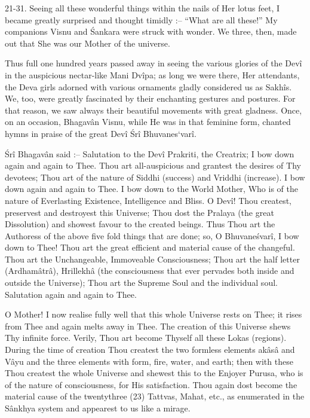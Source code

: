 21-31. Seeing all these wonderful things within the nails of Her lotus feet, I became greatly surprised and thought timidly :-- ``What are all these!'' My companions Visnu and \'Sankara were struck with wonder. We three, then, made out that She was our Mother of the universe.

Thus full one hundred years passed away in seeing the various glories of the Dev\^i in the auspicious nectar-like Mani Dv\^ipa; as long we were there, Her attendants, the Deva girls adorned with various ornaments gladly considered us as Sakh\^is. We, too, were greatly fascinated by their enchanting gestures and postures. For that reason, we saw always their beautiful movements with great gladness. Once, on an occasion, Bhagav\^an Visnu, while He was in that feminine form, chanted hymns in praise of the great Dev\^i \'Sr\^i Bhuvanes`var\^i.

\'Sr\^i Bhagav\^an said :-- Salutation to the Dev\^i Prakriti, the Creatrix; I bow down again and again to Thee. Thou art all-auspicious and grantest the desires of Thy devotees; Thou art of the nature of Siddhi (success) and Vriddhi (increase). I bow down again and again to Thee. I bow down to the World Mother, Who is of the nature of Everlasting Existence, Intelligence and Bliss. O Dev\^i! Thou createst, preservest and destroyest this Universe; Thou dost the Pralaya (the great Dissolution) and showest favour to the created beings. Thus Thou art the Authoress of the above five fold things that are done; so, O Bhuvane\'svar\^i, I bow down to Thee! Thou art the great efficient and material cause of the changeful. Thou art the Unchangeable, Immoveable Consciousness; Thou art the half letter (Ardham\^atr\^a), Hrillekh\^a (the consciousness that ever pervades both inside and outside the Universe); Thou art the Supreme Soul and the individual soul. Salutation again and again to Thee.

O Mother! I now realise fully well that this whole Universe rests on Thee; it rises from Thee and again melts away in Thee. The creation of this Universe shews Thy infinite force. Verily, Thou art become Thyself all these Lokas (regions). During the time of creation Thou createst the two formless elements ak\^as\^a and V\^ayu and the three elements with form, fire, water, and earth; then with these Thou createst the whole Universe and shewest this to the Enjoyer Purusa, who is of the nature of consciousness, for His satisfaction. Thou again dost become the material cause of the twentythree (23) Tattvas, Mahat, etc., as enumerated in the S\^ankhya system and appearest to us like a mirage.

